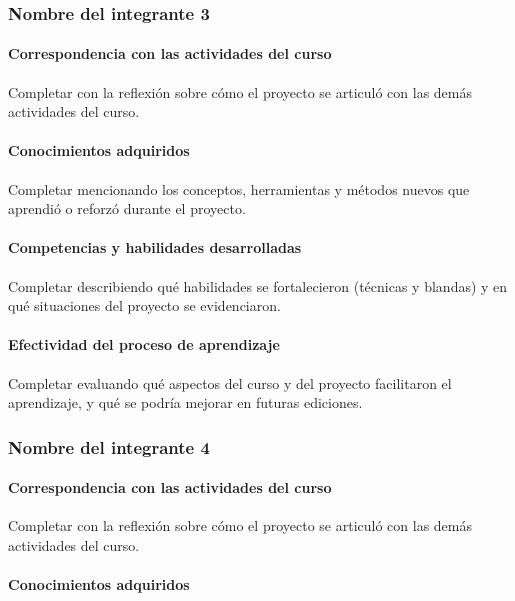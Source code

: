 \documentclass[11pt,a4paper]{article}
\begin{document}
\subsubsection*{Nombre del integrante 3}


\paragraph{Correspondencia con las actividades del curso}

Completar con la reflexión sobre cómo el proyecto se articuló con las demás
actividades del curso.

\paragraph{Conocimientos adquiridos}

Completar mencionando los conceptos, herramientas y métodos nuevos que
aprendió o reforzó durante el proyecto.

\paragraph{Competencias y habilidades desarrolladas}

Completar describiendo qué habilidades se fortalecieron (técnicas y blandas)
y en qué situaciones del proyecto se evidenciaron.

\paragraph{Efectividad del proceso de aprendizaje}

Completar evaluando qué aspectos del curso y del proyecto facilitaron el
aprendizaje, y qué se podría mejorar en futuras ediciones.

\subsubsection*{Nombre del integrante 4}


\paragraph{Correspondencia con las actividades del curso}

Completar con la reflexión sobre cómo el proyecto se articuló con las demás
actividades del curso.

\paragraph{Conocimientos adquiridos}
\end{document}
